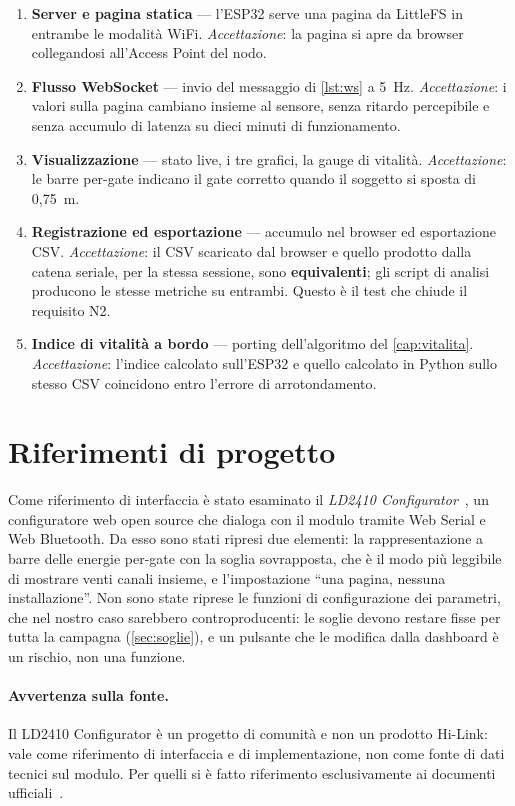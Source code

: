 \begin{enumerate}[leftmargin=1.8em,itemsep=3pt]
  \item \textbf{Server e pagina statica} --- l'ESP32 serve una pagina da LittleFS in
        entrambe le modalità WiFi. \emph{Accettazione}: la pagina si apre da browser
        collegandosi all'Access Point del nodo.
  \item \textbf{Flusso WebSocket} --- invio del messaggio di
        \cref{lst:ws} a 5~Hz. \emph{Accettazione}: i valori sulla pagina cambiano
        insieme al sensore, senza ritardo percepibile e senza accumulo di latenza su
        dieci minuti di funzionamento.
  \item \textbf{Visualizzazione} --- stato live, i tre grafici, la gauge di vitalità.
        \emph{Accettazione}: le barre per-gate indicano il gate corretto quando il
        soggetto si sposta di 0,75~m.
  \item \textbf{Registrazione ed esportazione} --- accumulo nel browser ed
        esportazione CSV. \emph{Accettazione}: il CSV scaricato dal browser e quello
        prodotto dalla catena seriale, per la stessa sessione, sono
        \textbf{equivalenti}; gli script di analisi producono le stesse metriche su
        entrambi. Questo è il test che chiude il requisito N2.
  \item \textbf{Indice di vitalità a bordo} --- porting dell'algoritmo del
        \cref{cap:vitalita}. \emph{Accettazione}: l'indice calcolato sull'ESP32 e
        quello calcolato in Python sullo stesso CSV coincidono entro l'errore di
        arrotondamento.
\end{enumerate}

\section{Riferimenti di progetto}

Come riferimento di interfaccia è stato esaminato il \emph{LD2410
Configurator}~\cite{ld2410configurator}, un configuratore web open source che dialoga
con il modulo tramite Web Serial e Web Bluetooth. Da esso sono stati ripresi due
elementi: la rappresentazione a barre delle energie per-gate con la soglia
sovrapposta, che è il modo più leggibile di mostrare venti canali insieme, e
l'impostazione ``una pagina, nessuna installazione''. Non sono state riprese le
funzioni di configurazione dei parametri, che nel nostro caso sarebbero controproducenti:
le soglie devono restare fisse per tutta la campagna (\cref{sec:soglie}), e un
pulsante che le modifica dalla dashboard è un rischio, non una funzione.

\paragraph{Avvertenza sulla fonte.} Il LD2410 Configurator è un progetto di comunità
e non un prodotto Hi-Link: vale come riferimento di interfaccia e di implementazione,
non come fonte di dati tecnici sul modulo. Per quelli si è fatto riferimento
esclusivamente ai documenti ufficiali~\cite{hilinkManualV104,hilinkProtoV107}.

